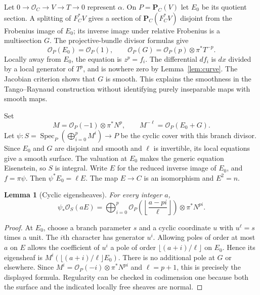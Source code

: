 \documentclass[11pt,a4paper]{article}
\newcommand{\OO}{\mathcal O}
\newcommand{\PP}{\mathbf P}
\newcommand{\Spec}{\operatorname{Spec}}
\newtheorem{lemma}[theorem]{Lemma}
\theoremstyle{definition}\newtheorem{definition}[theorem]{Definition}
\theoremstyle{remark}\newtheorem{remark}[theorem]{Remark}
\numberwithin{equation}{section}
\begin{document}
Let $0\to\OO_C\to V\to T\to0$ represent $\alpha$. On $P=\PP_C(V)$ let $E_0$ be its quotient section. A splitting of $F_C^*V$ gives a section of $\PP_C(F_C^*V)$ disjoint from the Frobenius image of $E_0$; its inverse image under relative Frobenius is a multisection $G$. The projective-bundle divisor formulas give
\begin{equation}\label{eq:branch}
 \OO_P(E_0)=\OO_P(1),\qquad
 \OO_P(G)=\OO_P(p)\otimes\pi^*T^{-p}.
\end{equation}
Locally away from $E_0$, the equation is $z^p=f_i$. The differential $df_i$ is $dx$ divided by a local generator of $T^p$, and is nowhere zero by Lemma~\ref{lem:curve}. The Jacobian criterion shows that $G$ is smooth. This explains the smoothness in the Tango--Raynaud construction without identifying purely inseparable maps with smooth maps.

Set
\[
 M=\OO_P(-1)\otimes\pi^*N^p,
 \qquad M^{-\ell}=\OO_P(E_0+G).
\]
Let $\psi:S=\Spec_P(\bigoplus_{i=0}^{p}M^i)\to P$ be the cyclic cover with this branch divisor. Since $E_0$ and $G$ are disjoint and smooth and $\ell$ is invertible, its local equations give a smooth surface. The valuation at $E_0$ makes the generic equation Eisenstein, so $S$ is integral. Write $E$ for the reduced inverse image of $E_0$, and $f=\pi\psi$. Then $\psi^*E_0=\ell E$. The map $E\to C$ is an isomorphism and $E^2=n$.

\begin{lemma}[Cyclic eigensheaves]\label{lem:eigen}
For every integer $a$,
\begin{equation}\label{eq:eigen}
 \psi_*\OO_S(aE)=
 \bigoplus_{i=0}^{p}\OO_P\!\left(\left\lfloor\frac{a-pi}{\ell}\right\rfloor\right)
                         \otimes\pi^*N^{pi}.
\end{equation}
\end{lemma}
\begin{proof}
At $E_0$, choose a branch parameter $s$ and a cyclic coordinate $u$ with $u^\ell=s$ times a unit. The $i$th character has generator $u^i$. Allowing poles of order at most $a$ on $E$ allows the coefficient of $u^i$ a pole of order $\lfloor(a+i)/\ell\rfloor$ on $E_0$. Hence its eigensheaf is
$M^i(\lfloor(a+i)/\ell\rfloor E_0)$. There is no additional pole at $G$ or elsewhere. Since $M^i=\OO_P(-i)\otimes\pi^*N^{pi}$ and $\ell=p+1$, this is precisely the displayed formula. Regularity can be checked in codimension one because both the surface and the indicated locally free sheaves are normal.
\end{proof}
\end{document}
